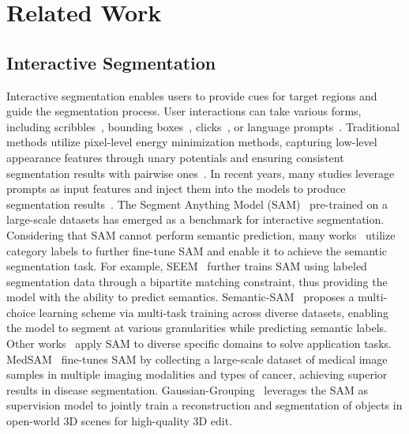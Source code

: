 \section{Related Work}
\label{sec:related}

\subsection{Interactive Segmentation}
Interactive segmentation enables users to provide cues for target regions and guide the segmentation process. User interactions can take various forms, including scribbles~\cite{sam,sam2,hq-sam,SegGPT}, bounding boxes~\cite{sam,hq-sam,liu2024segment}, clicks~\cite{yuan2020segfix,sam}, or language prompts~\cite{SegGPT,SEEM}. Traditional methods utilize pixel-level energy minimization methods, capturing low-level appearance features through unary potentials and ensuring consistent segmentation results with pairwise ones~\cite{wang2023segrefiner}. 
In recent years, many studies leverage prompts as input features and inject them into the models to produce segmentation results~\cite{sam,sam2,Semantic-SAM,SEEM}. The Segment Anything Model (SAM)~\cite{sam} pre-trained on a large-scale datasets has emerged as a benchmark for interactive segmentation. 
Considering that SAM cannot perform semantic prediction, many works~\cite{Semantic-SAM,SEEM} utilize category labels to further fine-tune SAM and enable it to achieve the semantic segmentation task. For example, SEEM~\cite{SEEM} further trains SAM using labeled segmentation data through a bipartite matching constraint, thus providing the model with the ability to predict semantics. Semantic-SAM~\cite{Semantic-SAM} proposes a multi-choice learning scheme via multi-task training across diverse datasets, enabling the model to segment at various granularities while predicting semantic labels.
Other works~\cite{ma2024segment,xu2024embodiedsam,Gaussian-Grouping} apply SAM to diverse specific domains to solve application tasks. MedSAM~\cite{ma2024segment} fine-tunes SAM by collecting a large-scale dataset of medical image samples in multiple imaging modalities and types of cancer, achieving superior results in disease segmentation.
Gaussian-Grouping~\cite{Gaussian-Grouping} leverages the SAM as supervision model to jointly train a reconstruction and segmentation of objects in open-world 3D scenes for high-quality 3D edit.


